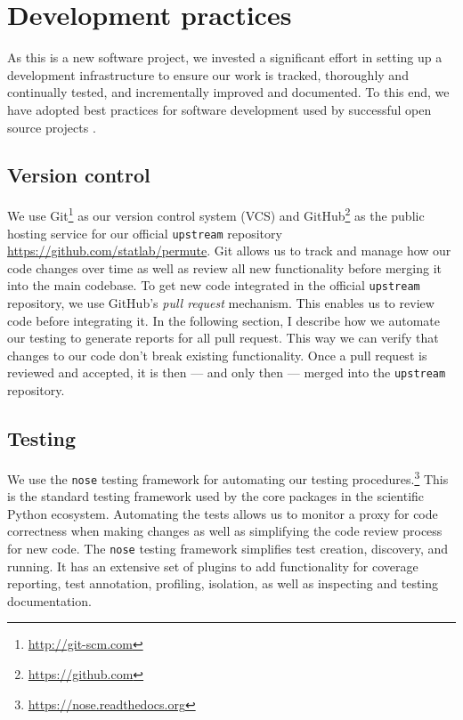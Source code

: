 \chapter{\label{ch:dev}Development practices}

As this is a new software project, we invested a significant effort in setting
up a development infrastructure to ensure our work is tracked,
thoroughly and continually tested, and incrementally improved and documented.
To this end, we have adopted best practices for software development used by
successful open source projects \cite{millman2014}.

\section{\label{sec:vc}Version control}

We use Git\footnote{\url{http://git-scm.com}} as our version control system
(VCS) and GitHub\footnote{\url{https://github.com}} as the public hosting
service for our official \texttt{upstream} repository
\url{https://github.com/statlab/permute}.  Git allows us to track and manage
how our code changes over time as well as review all new functionality before
merging it into the main codebase.  To get new code integrated in the official
\texttt{upstream} repository, we use GitHub's \emph{pull request} mechanism.
This enables us to review code before integrating it.  In the following
section, I describe how we automate our testing to generate reports for all
pull request.  This way we can verify that changes to our code don't break
existing functionality.  Once a pull request is reviewed and accepted, it is
then --- and only then --- merged into the \texttt{upstream} repository.

\section{\label{sec:test}Testing}

We use the \texttt{nose} testing framework for automating our testing
procedures.\footnote{\url{https://nose.readthedocs.org}}  This is the standard
testing framework used by the core packages in the scientific Python ecosystem.
Automating the tests allows us to monitor a proxy for code correctness when
making changes as well as simplifying the code review process for new code. 
The \texttt{nose} testing framework simplifies test creation, discovery,
and running. It has an extensive set of plugins to add functionality
for coverage reporting, test annotation, profiling, isolation, as well
as inspecting and testing documentation.

